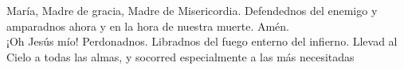 \documentclass[./rosario.tex]{subfiles}
\begin{document}
    \begin{center}
        María, Madre de gracia, Madre de Misericordia. Defendednos del enemigo y amparadnos ahora y en la hora de nuestra muerte. Amén. \\
        ¡Oh Jesús mío! Perdonadnos. Libradnos del fuego enterno del infierno. Llevad al Cielo a todas las almas, y socorred especialmente a las más necesitadas
    \end{center}
\end{document}
